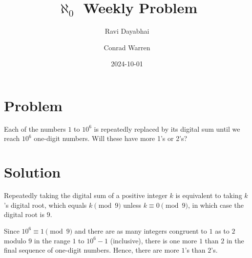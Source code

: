 \documentclass{article}
\title{$\aleph_{0}$ Weekly Problem}
\author{Ravi Dayabhai \and Conrad Warren}
\date{2024-10-01}
\begin{document}
\maketitle

\section*{Problem}

Each of the numbers $1$ to $10^{6}$ is repeatedly replaced by its digital sum until we reach $10^{6}$ one-digit numbers. 
Will these have more 1’s or 2’s?

\section*{Solution}

Repeatedly taking the digital sum of a positive integer $k$ is equivalent to taking $k$'s digital root, which equals $k \pmod{9}$ unless $k \equiv 0 \pmod{9}$, in which case the digital root is $9$.

Since $10^{6} \equiv 1 \pmod{9}$ and there are as many integers congruent to $1$ as to $2$ modulo $9$ in the range $1$ to $10^{6}-1$ (inclusive), there is one more $1$ than $2$ in the final sequence of one-digit numbers. Hence, there are more $1$'s than $2$'s.
\end{document}
